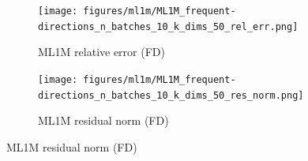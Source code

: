  \begin{figure}\ContinuedFloat
  \begin{subfigure}[b]{0.48\textwidth}
    \centering
    \texttt{[image: figures/ml1m/ML1M\_frequent-directions\_n\_batches\_10\_k\_dims\_50\_rel\_err.png]}
    \caption{ML1M relative error (FD)}
  \end{subfigure}
  \hfill
  \begin{subfigure}[b]{0.48\textwidth}
    \centering
    \texttt{[image: figures/ml1m/ML1M\_frequent-directions\_n\_batches\_10\_k\_dims\_50\_res\_norm.png]}
    \caption{ML1M residual norm (FD)}
  \end{subfigure}
\end{figure}